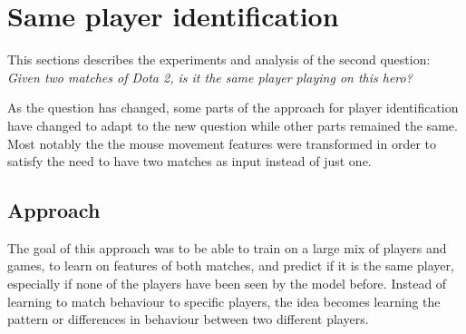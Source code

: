 \documentclass[Report.tex]{subfiles}
\begin{document}
\section{Same player identification}\label{sec:pair-classification}
This sections describes the experiments and analysis of the second question: \textit{Given two matches of Dota 2, is it the same player playing on this hero?}

As the question has changed, some parts of the approach for player identification have changed to adapt to the new question while other parts remained the same. Most notably the the mouse movement features were transformed in order to satisfy the need to have two matches as input instead of just one. 

\subsection{Approach}

The goal of this approach was to be able to train on a large mix of players and games, to learn on features of both matches, and predict if it is the same player, especially if none of the players have been seen by the model before. Instead of learning to match behaviour to specific players, the idea becomes learning the pattern or differences in behaviour between two different players. 
\end{document}
